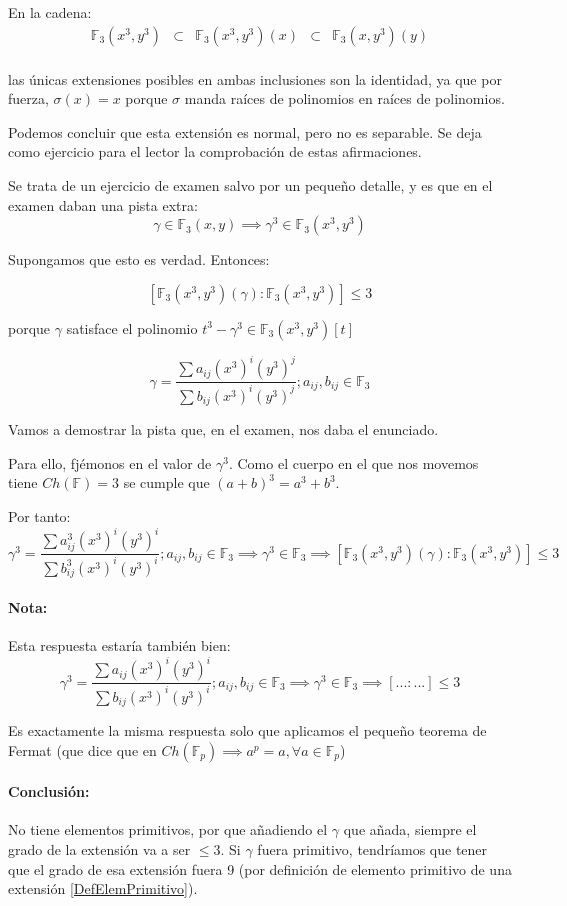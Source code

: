 \begin{problem}[3]
En la cadena:
$$\begin{array}{ccccc}\mathbb{F}_3(x^3,y^3) &\subset& \mathbb{F}_3(x^3,y^3)(x) &\subset& \mathbb{F}_3(x,y^3)(y)\\
\end{array}$$

las únicas extensiones posibles en ambas inclusiones son la identidad, ya que por fuerza, $σ(x) = x$ porque $σ$ manda raíces de polinomios en raíces de polinomios.

Podemos concluir que esta extensión es normal, pero no es separable. Se deja como ejercicio para el lector la comprobación de estas afirmaciones.

\spart Se trata de un ejercicio de examen salvo por un pequeño detalle, y es que en el examen daban una pista extra:
\[γ∈\mathbb{F}_3(x,y) \implies γ^3 ∈\mathbb{F}_3(x^3,y^3)\]

Supongamos que esto es verdad. Entonces:

\[[\mathbb{F}_3(x^3,y^3)(γ) : \mathbb{F}_3(x^3,y^3)] ≤ 3\]

porque $γ$ satisface el polinomio $t^3 -γ^3 ∈ \mathbb{F}_3(x^3,y^3)[t]$

\[γ = \frac{\sum a_{ij}(x^3)^i(y^3)^j}{\sum b_{ij}(x^3)^i(y^3)^j}; a_{ij},b_{ij} ∈ \mathbb{F}_3\]

Vamos a demostrar la pista que, en el examen, nos daba el enunciado.

Para ello, fjémonos en el valor de $γ^3$. Como el cuerpo en el que nos movemos tiene $Ch(\mathbb{F}) = 3$ se cumple que $(a+b)^{3} = a^3 + b^3$.

Por tanto:
\[γ^3 = \frac{\sum a_{ij}^3(x^3)^i(y^3)^i}{\sum b_{ij}^3(x^3)^i(y^3)^i}; a_{ij},b_{ij} ∈ \mathbb{F}_3 \implies γ^3 ∈ \mathbb{F}_3 \implies [\mathbb{F}_3(x^3,y^3)(γ) : \mathbb{F}_3(x^3,y^3)] ≤ 3\]

\paragraph{Nota:} Esta respuesta estaría también bien:
$$γ^3 = \frac{\sum a_{ij}(x^3)^i(y^3)^i}{\sum b_{ij}(x^3)^i(y^3)^i}; a_{ij},b_{ij} ∈ \mathbb{F}_3 \implies γ^3 ∈ \mathbb{F}_3 \implies [... : ...] ≤ 3$$

Es exactamente la misma respuesta solo que aplicamos el pequeño teorema de Fermat (que dice que en $Ch(\mathbb{F}_p) \implies a^p = a, ∀a∈\mathbb{F}_p$)


\paragraph{Conclusión:} No tiene elementos primitivos, por que añadiendo el $γ$ que añada, siempre el grado de la extensión va a ser $≤3$. Si $γ$ fuera primitivo, tendríamos que tener que el grado de esa extensión fuera 9 (por definición de elemento primitivo de una extensión \ref{DefElemPrimitivo}).

\end{problem}


